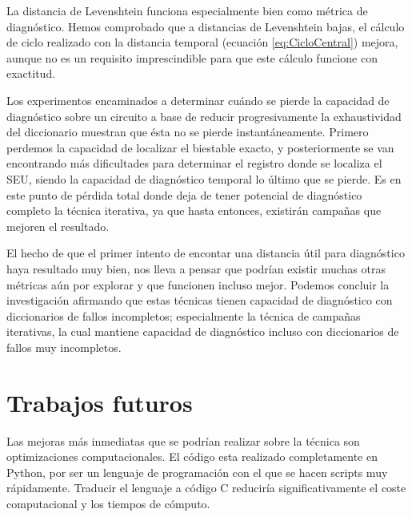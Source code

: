 La distancia de Levenshtein funciona especialmente bien como métrica de
diagnóstico. Hemos comprobado que a distancias de Levenshtein bajas, el cálculo de
ciclo realizado con la distancia temporal (ecuación \ref{eq:CicloCentral}) mejora,
aunque no es un requisito imprescindible para que este cálculo funcione con
exactitud.

Los experimentos encaminados a determinar cuándo se pierde la capacidad de
diagnóstico sobre un circuito a base de reducir progresivamente la exhaustividad
del diccionario muestran que ésta no se pierde instantáneamente. Primero perdemos
la capacidad de localizar el biestable exacto, y posteriormente se van encontrando
más dificultades para determinar el registro donde se localiza el \gls{SEU},
siendo la capacidad de diagnóstico temporal lo último que se pierde. Es en este
punto de pérdida total donde deja de tener potencial de diagnóstico completo la
técnica iterativa, ya que hasta entonces, existirán campañas que mejoren el
resultado.

El hecho de que el primer intento de encontar una distancia útil para diagnóstico
haya resultado muy bien, nos lleva a pensar que podrían existir muchas otras
métricas aún por explorar y que funcionen incluso mejor.
Podemos concluir la investigación afirmando que estas técnicas tienen capacidad de
diagnóstico con diccionarios de fallos incompletos; especialmente la técnica de 
campañas iterativas, la cual mantiene capacidad de diagnóstico incluso con 
diccionarios de fallos muy incompletos.

\section{Trabajos futuros}
\label{sec:TrabajosFuturos}
Las mejoras más inmediatas que se podrían realizar sobre la técnica son
optimizaciones computacionales. El código esta realizado completamente en Python,
por ser un lenguaje de programación con el que se hacen scripts muy rápidamente.
Traducir el lenguaje a código C reduciría significativamente el coste
computacional y los tiempos de cómputo.

